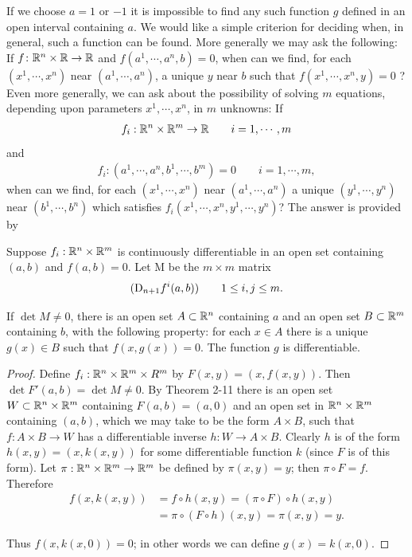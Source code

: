 If we choose $a = 1$ or $-1$ it is impossible to find any such
function $g$ defined in an open interval containing $a$.
We would like a simple criterion for deciding when, in general,
such a function can be found. More generally we may ask
the following: If $f\colon{}\mathbb{R}^n \times \mathbb{R}\to \mathbb{R}$ and 
$f(a^1,\cdots,a^n, b) = 0$, when can we find, for each 
$(x^1,\cdots ,x^n)$ near $(a^1,\cdots,a^n)$,
a unique $y$ near $b$ such that $f(x^1,\cdots,x^n,y) = 0$ ? Even
more generally, we can ask about the possibility of solving
$m$ equations, depending upon parameters $x^1,\cdots,x^n$, in $m$
unknowns: If
\begin{align*}
    f_i:\mathbb{R}^n\times \mathbb{R}^m \to \mathbb{R}\qquad i=1, \cdots, m
\end{align*}
and
\begin{align*}
    f_i:(a^1, \cdots, a^n, b^1, \cdots, b^m) = 0\qquad i=1, \cdots, m,
\end{align*} 
when can we find, for each $(x^1,\cdots,x^n)$ near $(a^1,\cdots,a^n)$ a unique 
$(y^1,\cdots,y^n)$ near $(b^1,\cdots,b^n)$ which satisfies $f_i(x^1,\cdots,x^n, y^1,\cdots,y^n)$?
The answer is provided by 
\begin{theorem}
    Suppose $f_i:\mathbb{R}^n\times \mathbb{R}^m$ is continuously differentiable in an open set
    containing $(a,b)$ and $f(a,b) = 0$. Let M be the $m\times m$ matrix
    \begin{align*}
        (\mathrm{D}_{n+1}f^i(a, b))\qquad 1\le i,j\le m.
    \end{align*}

    If  $\det M \neq 0$, there is an open set $A \subset \mathbb{R}^n$ containing $a$ 
    and an open set $B \subset \mathbb{R}^m$ containing $b$, with the following property: for
    each $x \in A$ there is a unique $g(x) \in B$ such that $f(x,g(x)) = 0$.
    The function $g$ is differentiable.
\end{theorem}

\begin{proof}
    Define $f_i:\mathbb{R}^n\times \mathbb{R}^m\times R^m$ by $F(x, y) = (x, f(x, y))$. Then 
    $\det F'(a, b) = \det M\neq 0$. By Theorem 2-11 there is an open set $W\subset \mathbb{R}^n\times \mathbb{R}^m$
    containing $F(a, b)=(a, 0)$ and an open set in $\mathbb{R}^n\times \mathbb{R}^m$ containing $(a, b)$, which
    we may take to be the form $A\times B$, such that $f\colon{}A\times B\to W$ has a differentiable inverse 
    $h\colon{}W\to A\times B$. Clearly $h$ is of the form $h(x, y) = (x, k(x, y))$ for some differentiable 
    function $k$ (since $F$ is of this form). Let $\pi: \mathbb{R}^n\times \mathbb{R}^m \to \mathbb{R}^m$ be defined 
    by $\pi(x, y) = y$; then $\pi\circ F = f$. Therefore 
    \begin{align*}
        f(x, k(x,y)) 
        & = f\circ h(x, y) = (\pi\circ F)\circ h(x, y) \\
        & = \pi\circ (F\circ h)(x, y) = \pi(x, y) = y.
    \end{align*} 

    Thus $f(x, k(x, 0)) = 0$; in other words we can define $g(x) = k(x, 0)$.
\end{proof}

